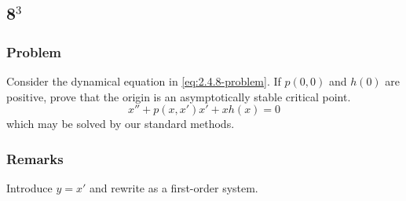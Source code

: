 \documentclass[12pt,twoside]{article}
\begin{document}
\subsection{8$^3$}
\subsubsection*{Problem}
Consider the dynamical equation in \cref{eq:2.4.8-problem}. If $p(0,0)$ and $h(0)$
are positive, prove that the origin is an asymptotically stable critical point.
\begin{equation}
  \label{eq:2.4.8-problem}
  x''+p(x,x')x' + xh(x) = 0
\end{equation}
which may be solved by our standard methods.
\subsubsection*{Remarks}
Introduce $y=x'$ and rewrite as a first-order system.
\end{document}
